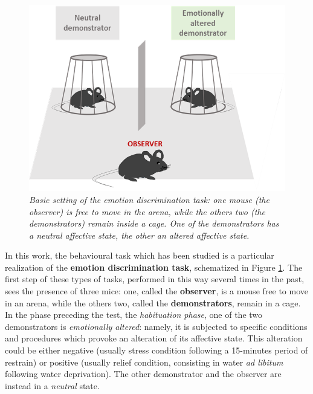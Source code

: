 \documentclass[12pt, a4paper]{article}
\begin{document}
\begin{figure}
	\begin{center}
		\includegraphics[scale=.60]{mice_task.png} 
	\end{center} 
	\caption{\textit{Basic setting of the emotion discrimination task: one mouse (the \textit{observer}) is free to move in the arena, while the others two (the \textit{demonstrators}) remain inside a cage. One of the demonstrators has a neutral affective state, the other an altered affective state.}} \label{emotion discrimination}
	
\end{figure}
In this work, the behavioural task which has been studied is a particular realization of the \textbf{emotion discrimination task}, schematized in Figure \ref*{emotion discrimination}. The first step of these types of tasks, performed in this way several times in the past, sees the presence of three mice: one, called the \textbf{observer}, is a mouse free to move in an arena, while the others two, called the \textbf{demonstrators}, remain in a cage. In the phase preceding the test, the \textit{habituation phase}, one of the two demonstrators is \textit{emotionally altered}: namely, it is subjected to specific conditions and procedures which provoke an alteration of its affective state. This alteration could be either negative (usually stress condition following a 15-minutes period of restrain) or positive (usually relief condition, consisting in water \textit{ad libitum} following water deprivation). The other demonstrator and the observer are instead in a \textit{neutral} state.\\
\end{document}
